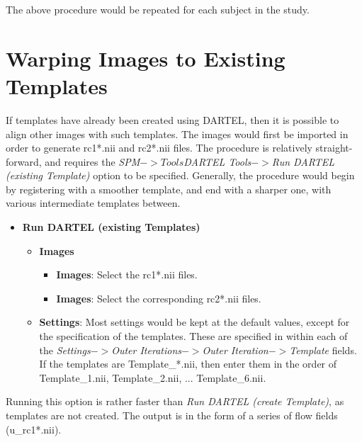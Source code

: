 The above procedure would be repeated for each subject in the study.

\section{Warping Images to Existing Templates}
If templates have already been created using DARTEL, then it is possible to align other images with such templates.
The images would first be imported in order to generate rc1*.nii and rc2*.nii files.
The procedure is relatively straight-forward, and requires the \emph{SPM$->Tools$DARTEL Tools$->$Run DARTEL (existing Template)} option to be specified.
Generally, the procedure would begin by registering with a smoother template, and end with a sharper one, with various intermediate templates between.
\begin{itemize}
\item{{\bf Run DARTEL (existing Templates)}
  \begin{itemize}
  \item{{\bf Images}
    \begin{itemize}
    \item{{\bf Images}: Select the rc1*.nii files.}
    \item{{\bf Images}: Select the corresponding rc2*.nii files.}
    \end{itemize}
  }
  \item{{\bf Settings}: Most settings would be kept at the default values, except for the specification of the templates.
These are specified in within each of the \emph{Settings$->$Outer Iterations$->$Outer Iteration$->$Template} fields.
If the templates are Template\_*.nii, then enter them in the order of Template\_1.nii, Template\_2.nii, ... Template\_6.nii.
  }
  \end{itemize}
}
\end{itemize}

Running this option is rather faster than \emph{Run DARTEL (create Template)}, as templates are not created.
The output is in the form of a series of flow fields (u\_rc1*.nii).

